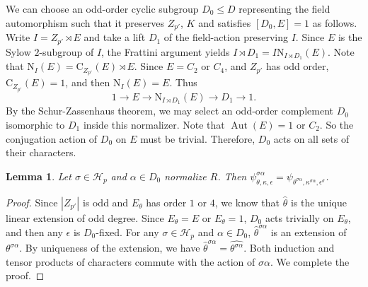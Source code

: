 \documentclass[11pt,a4paper]{article}
\numberwithin{equation}{section}
\newtheorem{lemma}[theorem]{Lemma}
\theoremstyle{definition}
\theoremstyle{remark}
\newcommand{\Aut}{\operatorname{Aut}}
\newcommand{\HH}{\mathcal H}
\newcommand{\NN}{\mathrm N}
\newcommand{\CC}{\mathrm C}
\begin{document}
We can choose an odd-order cyclic subgroup $D_0\leq D$ representing the field automorphism such that it preserves $Z_{p'}$, $K$ and satisfies $[D_0,E]=1$ as follows. Write $I=Z_{p'} \rtimes E$ and take a lift $D_1$ of the field-action preserving $I$. Since $E$ is the Sylow $2$-subgroup of $I$, the Frattini argument yields $I \rtimes D_1=I\NN_{I\rtimes D_1}(E)$.
Note that $\NN_I(E)=\CC_{Z_{p'}}(E)\rtimes E$.
Since $E=C_2$ or $C_4$, and $Z_{p'}$ has odd order, $\CC_{Z_{p'}}(E)=1$, and then $\NN_I(E)=E$. Thus
$$1 \longrightarrow E \longrightarrow \NN_{I\rtimes D_1}(E) \longrightarrow D_1 \longrightarrow 1.$$
By the Schur-Zassenhaus theorem, we may select an odd-order complement $D_0$ isomorphic to $D_1$ inside this normalizer. Note that $\Aut(E)=1$ or $C_2$. So the conjugation action of $D_0$ on $E$ must be trivial. Therefore, $D_0$ acts on all sets of their characters.
\begin{lemma}\label{lem:3.5}
Let $\sigma\in\HH_p$ and $\alpha\in D_0$ normalize $R$. Then $\psi_{\theta,\kappa,\epsilon}^{\sigma\alpha}=\psi_{\theta^{\sigma\alpha},\kappa^{\sigma\alpha},\epsilon^{\sigma}}$.
\end{lemma}
\begin{proof}
Since $|Z_{p'}|$ is odd and $E_\theta$ has order $1$ or $4$, we know that $\widehat \theta$ is the unique linear extension of odd degree. Since $E_\theta=E$ or $E_\theta=1$, $D_0$ acts trivially on $E_\theta$, and then any $\epsilon$ is $D_0$-fixed. For any $\sigma\in\HH_p$ and $\alpha\in D_0$, $\widehat \theta^{\sigma\alpha}$ is an extension of $\theta^{\sigma\alpha}$. By uniqueness of the extension, we have $\widehat \theta^{\sigma\alpha}=\widehat{ \theta^{\sigma\alpha}}$. Both induction and tensor products of characters commute with the action of $\sigma\alpha$. We complete the proof. 
\end{proof}
\end{document}
